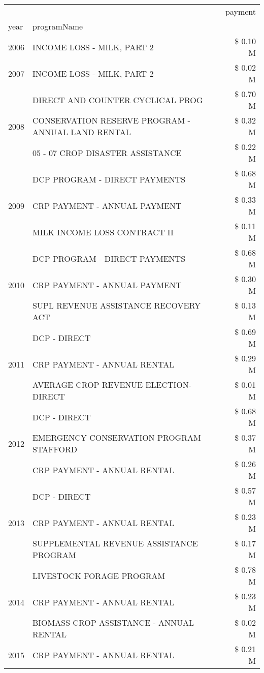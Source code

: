 \begin{tabular}{llr}
\toprule
 &  & payment \\
year & programName &  \\
\midrule
2006 & INCOME LOSS - MILK, PART 2 & \$ 0.10 M \\
\cline{1-3}
2007 & INCOME LOSS - MILK, PART 2 & \$ 0.02 M \\
\cline{1-3}
\multirow[t]{3}{*}{2008} & DIRECT AND COUNTER CYCLICAL PROG & \$ 0.70 M \\
 & CONSERVATION RESERVE PROGRAM - ANNUAL LAND RENTAL & \$ 0.32 M \\
 & 05 - 07 CROP DISASTER ASSISTANCE & \$ 0.22 M \\
\cline{1-3}
\multirow[t]{3}{*}{2009} & DCP PROGRAM - DIRECT PAYMENTS & \$ 0.68 M \\
 & CRP PAYMENT - ANNUAL PAYMENT & \$ 0.33 M \\
 & MILK INCOME LOSS CONTRACT II & \$ 0.11 M \\
\cline{1-3}
\multirow[t]{3}{*}{2010} & DCP PROGRAM - DIRECT PAYMENTS & \$ 0.68 M \\
 & CRP PAYMENT - ANNUAL PAYMENT & \$ 0.30 M \\
 & SUPL REVENUE ASSISTANCE RECOVERY ACT & \$ 0.13 M \\
\cline{1-3}
\multirow[t]{3}{*}{2011} & DCP - DIRECT & \$ 0.69 M \\
 & CRP PAYMENT - ANNUAL RENTAL & \$ 0.29 M \\
 & AVERAGE CROP REVENUE ELECTION-DIRECT & \$ 0.01 M \\
\cline{1-3}
\multirow[t]{3}{*}{2012} & DCP - DIRECT & \$ 0.68 M \\
 & EMERGENCY CONSERVATION PROGRAM STAFFORD & \$ 0.37 M \\
 & CRP PAYMENT - ANNUAL RENTAL & \$ 0.26 M \\
\cline{1-3}
\multirow[t]{3}{*}{2013} & DCP - DIRECT & \$ 0.57 M \\
 & CRP PAYMENT - ANNUAL RENTAL & \$ 0.23 M \\
 & SUPPLEMENTAL REVENUE ASSISTANCE PROGRAM & \$ 0.17 M \\
\cline{1-3}
\multirow[t]{3}{*}{2014} & LIVESTOCK FORAGE PROGRAM & \$ 0.78 M \\
 & CRP PAYMENT - ANNUAL RENTAL & \$ 0.23 M \\
 & BIOMASS CROP ASSISTANCE - ANNUAL RENTAL & \$ 0.02 M \\
\cline{1-3}
\multirow[t]{3}{*}{2015} & CRP PAYMENT - ANNUAL RENTAL & \$ 0.21 M \\

\end{tabular}
